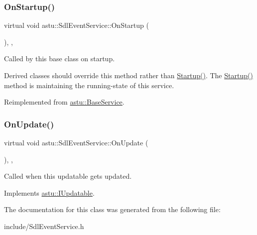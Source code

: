 \subsubsection{\texorpdfstring{On\+Startup()}{OnStartup()}}
{\footnotesize\ttfamily virtual void astu\+::\+Sdl\+Event\+Service\+::\+On\+Startup (\begin{DoxyParamCaption}{ }\end{DoxyParamCaption})\hspace{0.3cm}{\ttfamily [override]}, {\ttfamily [protected]}, {\ttfamily [virtual]}}

Called by this base class on startup.

Derived classes should override this method rather than {\ttfamily \hyperlink{classastu_1_1UpdatableBaseService_a47e3725f717cee3cd8983f485b2a0243}{Startup()}}. The {\ttfamily \hyperlink{classastu_1_1UpdatableBaseService_a47e3725f717cee3cd8983f485b2a0243}{Startup()}} method is maintaining the running-\/state of this service. 

Reimplemented from \hyperlink{classastu_1_1BaseService_ac8710cd2d6dcc990db65e7c8ccfbc5ff}{astu\+::\+Base\+Service}.

\mbox{\label{classastu_1_1SdlEventService_a67090f42250433506b8bfb4254df9e50}} 
\subsubsection{\texorpdfstring{On\+Update()}{OnUpdate()}}
{\footnotesize\ttfamily virtual void astu\+::\+Sdl\+Event\+Service\+::\+On\+Update (\begin{DoxyParamCaption}{ }\end{DoxyParamCaption})\hspace{0.3cm}{\ttfamily [override]}, {\ttfamily [protected]}, {\ttfamily [virtual]}}

Called when this updatable gets updated. 

Implements \hyperlink{classastu_1_1IUpdatable_a76c7c6e2a71b725bbdbdf6808ef4743f}{astu\+::\+I\+Updatable}.



The documentation for this class was generated from the following file\+:\begin{DoxyCompactItemize}
\item 
include/Sdl\+Event\+Service.\+h\end{DoxyCompactItemize}

